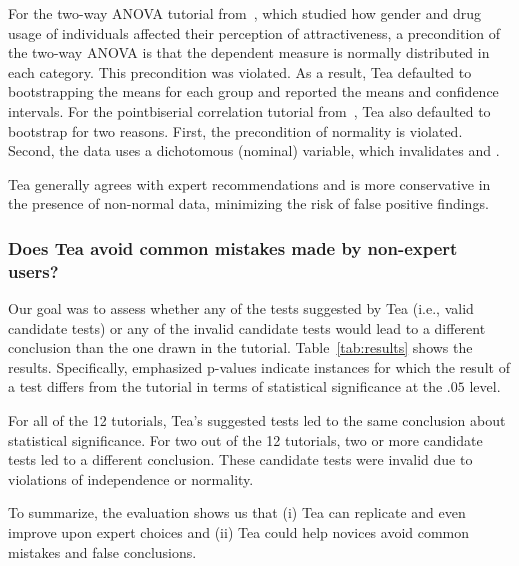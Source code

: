For the two-way ANOVA tutorial from~\cite{field2012discoveringR}, which studied how gender
and drug usage of individuals affected their perception of attractiveness, a
precondition of the two-way ANOVA is that the dependent measure is normally
distributed in each category. This precondition was violated.  As a result, Tea
defaulted to bootstrapping the means for each group and reported the means and
confidence intervals. 
For the pointbiserial correlation tutorial from~\cite{field2012discoveringR},
Tea also defaulted to bootstrap for two reasons. First, the precondition of
normality is violated. Second, the data uses a dichotomous (nominal) variable,
which invalidates \srho and \ktau.

Tea generally agrees with expert recommendations and is more conservative
in the presence of non-normal data, minimizing the risk of false positive
findings.

\subsubsection{Does Tea avoid common mistakes made by non-expert users?}
Our goal was to assess whether any of the tests suggested by Tea (i.e., valid
candidate tests) or any of the invalid candidate tests would lead to a different
conclusion than the one drawn in the tutorial. Table~\ref{tab:results} shows the
results. Specifically, emphasized p-values indicate instances for which the
result of a test differs from the tutorial in terms of statistical significance
at the $.05$ level.

For all of the 12 tutorials, Tea's suggested tests led to the same conclusion
about statistical significance. For two out of the 12 tutorials, two or more
candidate tests led to a different conclusion. These candidate tests were
invalid due to violations of independence or normality.

To summarize, the evaluation shows us that (i) Tea can replicate and even improve
upon expert choices and (ii) Tea could help novices avoid common mistakes and
false conclusions.
